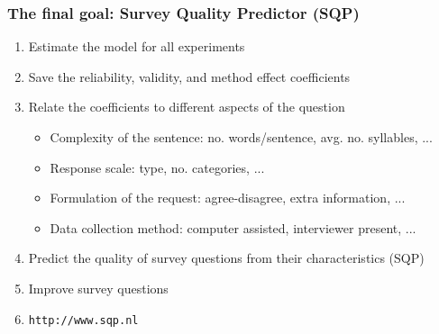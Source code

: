 \documentclass{beamer}
\begin{document}
\begin{frame}
 \frametitle{The final goal: Survey Quality Predictor (SQP)}

	\begin{enumerate}[<alert@+>]
		\item Estimate the model for all experiments
		\item Save the reliability, validity, and method effect coefficients
		\item Relate the coefficients to different aspects of the question
			\begin{itemize}[<4-|alert@+>]
				\item Complexity of the sentence: no. words/sentence, avg. no. syllables, ...
				\item Response scale: type, no. categories, ...
				\item Formulation of the request: agree-disagree, extra information, ...
				\item Data collection method: computer assisted, interviewer present, ...
			\end{itemize}
		\item Predict the quality of survey questions from their characteristics (SQP)
		\item Improve survey questions
		\item \texttt{http://www.sqp.nl} 
	\end{enumerate}
\end{frame}
\end{document}
